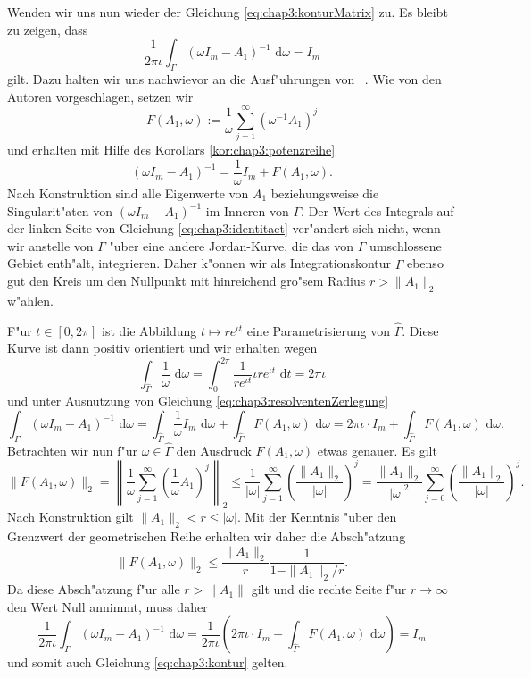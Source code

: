 Wenden wir uns nun wieder der Gleichung \eqref{eq:chap3:konturMatrix} zu. Es bleibt zu zeigen, dass
\begin{equation}\label{eq:chap3:identitaet}
\frac{1}{2\pi\iota}\int_\Gamma (\omega I_m - A_1)^{-1} \text{ d}\omega = I_m
\end{equation}
gilt. Dazu halten wir uns nachwievor an die Ausf"uhrungen von ~\cite[Abschnitt 4.9]{liesen}. Wie von den Autoren vorgeschlagen, setzen wir
\[
F(A_1,\omega) := \frac{1}{\omega}\sum_{j=1}^\infty(\omega^{-1}A_1)^j
\]
und erhalten mit Hilfe des Korollars \ref{kor:chap3:potenzreihe}
\begin{equation}\label{eq:chap3:resolventenZerlegung}
(\omega I_m - A_1)^{-1} = \frac{1}{\omega} I_m + F(A_1,\omega).
\end{equation}
Nach Konstruktion sind alle Eigenwerte von $A_1$ beziehungsweise die Singularit"aten von $(\omega I_m - A_1)^{-1}$ im Inneren von $\Gamma$. Der Wert des Integrals auf der linken Seite von Gleichung \eqref{eq:chap3:identitaet} ver"andert sich nicht, wenn wir anstelle von $\Gamma$ "uber eine
andere Jordan-Kurve, die das von $\Gamma$ umschlossene Gebiet enth"alt, integrieren. Daher k"onnen wir als Integrationskontur  $\widehat{\Gamma}$ ebenso gut den Kreis um den Nullpunkt mit hinreichend gro"sem Radius $r > \|A_1\|_2$
w"ahlen.

\newpage

F"ur $t\in[0,2\pi]$ ist die Abbildung $t\mapsto re^{\iota t}$ eine Parametrisierung von $\widehat{\Gamma}$. Diese Kurve ist dann positiv orientiert und wir erhalten wegen
\[
\int_{\widehat{\Gamma}} \frac{1}{\omega} \text{ d}\omega = \int_0^{2\pi}\frac{1}{r e^{\iota t}} \iota r e^{\iota t} \text{ d}t = 2\pi \iota
\]
und unter Ausnutzung von Gleichung \eqref{eq:chap3:resolventenZerlegung}
\[
\int_\Gamma (\omega I_m - A_1)^{-1} \text{ d}\omega =
\int_{\widehat{\Gamma}} \frac{1}{\omega}I_m
\text{ d}\omega
+ \int_{\widehat{\Gamma}} F(A_1,\omega) \text{ d}\omega
= 2\pi\iota \cdot I_m + \int_{\widehat{\Gamma}} F(A_1,\omega) \text{ d}\omega.
\]
Betrachten wir nun f"ur $\omega \in\widehat{\Gamma}$ den Ausdruck $F(A_1,\omega)$ etwas genauer.
Es gilt
\[
\|F(A_1,\omega)\|_2 =
\left\| \frac{1}{\omega} \sum_{j=1}^\infty \left( \frac{1}{\omega} A_1 \right)^j \right\|_2
\le \frac{1}{|\omega|} \sum_{j=1}^\infty \left(\frac{\|A_1\|_2}{|\omega|} \right)^j
= \frac{\|A_1\|_2}{|\omega|^2}\sum_{j=0}^\infty \left(\frac{\|A_1\|_2}{|\omega|} \right)^j.
\]
Nach Konstruktion gilt $\|A_1\|_2 < r \le |\omega|$.
Mit der Kenntnis "uber den Grenzwert der geometrischen Reihe erhalten wir daher die Absch"atzung
\[
\|F(A_1,\omega)\|_2 \le \frac{\| A_1 \|_2}{r}
\frac{1}{1-\|A_1\|_2 / r}.
\]
Da diese Absch"atzung f"ur alle $r > \|A_1\|$ gilt und die rechte Seite f"ur $r\to\infty$ den Wert Null annimmt, muss daher
\[
\frac{1}{2\pi\iota}\int_\Gamma (\omega I_m - A_1)^{-1} \text{ d}\omega =
 \frac{1}{2\pi\iota} \left(2\pi\iota \cdot I_m + \int_{\widehat{\Gamma}} F(A_1,\omega) \text{ d}\omega\right)
= I_m
\]
und somit auch Gleichung \eqref{eq:chap3:kontur} gelten.\\

